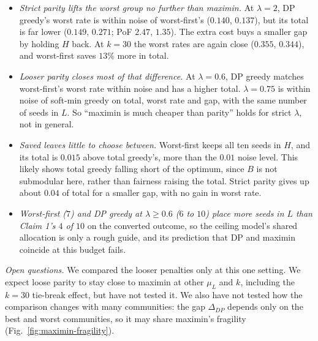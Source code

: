 \begin{itemize}
\item \emph{Strict parity lifts the worst group no further than maximin.} At $\lambda=2$, DP greedy's worst rate is within noise of worst-first's ($0.140$, $0.137$), but its total is far lower ($0.149$, $0.271$; PoF $2.47$, $1.35$). The extra cost buys a smaller gap by holding $H$ back. At $k=30$ the worst rates are again close ($0.355$, $0.344$), and worst-first saves $13\%$ more in total.
\item \emph{Looser parity closes most of that difference.} At $\lambda=0.6$, DP greedy matches worst-first's worst rate within noise and has a higher total. $\lambda=0.75$ is within noise of soft-min greedy on total, worst rate and gap, with the same number of seeds in $L$. So ``maximin is much cheaper than parity'' holds for strict $\lambda$, not in general.
\item \emph{Saved leaves little to choose between.} Worst-first keeps all ten seeds in $H$, and its total is $0.015$ above total greedy's, more than the $0.01$ noise level. This likely shows total greedy falling short of the optimum, since $B$ is not submodular here, rather than fairness raising the total. Strict parity gives up about $0.04$ of total for a smaller gap, with no gain in worst rate.
\item \emph{Worst-first ($7$) and DP greedy at $\lambda\ge0.6$ ($6$ to $10$) place more seeds in $L$ than Claim 1's $4$ of $10$} on the converted outcome, so the ceiling model's shared allocation is only a rough guide, and its prediction that DP and maximin coincide at this budget fails.
\end{itemize}

\emph{Open questions.} We compared the looser penalties only at this one setting. We expect loose parity to stay close to maximin at other $\mu_L$ and $k$, including the $k=30$ tie-break effect, but have not tested it. We also have not tested how the comparison changes with many communities: the gap $\Delta_{DP}$ depends only on the best and worst communities, so it may share maximin's fragility (Fig.~\ref{fig:maximin-fragility}).
